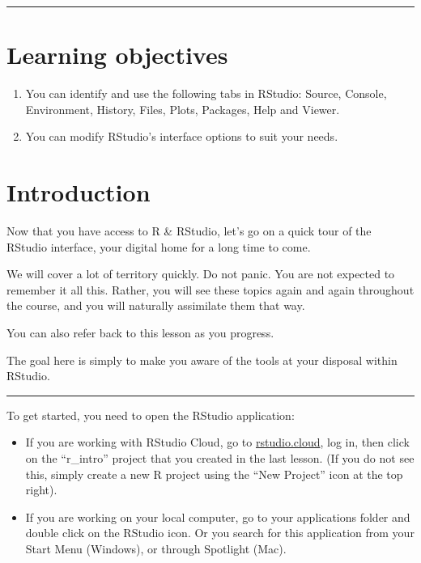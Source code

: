 \documentclass[
  letterpaper,
  DIV=11,
  numbers=noendperiod]{scrreprt}
\begin{document}
\begin{center}\rule{0.5\linewidth}{0.5pt}\end{center}

\hypertarget{learning-objectives}{%
\section{Learning objectives}\label{learning-objectives}}

\begin{enumerate}
\def\labelenumi{\arabic{enumi}.}
\item
  You can identify and use the following tabs in RStudio: Source,
  Console, Environment, History, Files, Plots, Packages, Help and
  Viewer.
\item
  You can modify RStudio's interface options to suit your needs.
\end{enumerate}

\hypertarget{introduction-3}{%
\section{Introduction}\label{introduction-3}}

Now that you have access to R \& RStudio, let's go on a quick tour of
the RStudio interface, your digital home for a long time to come.

We will cover a lot of territory quickly. Do not panic. You are not
expected to remember it all this. Rather, you will see these topics
again and again throughout the course, and you will naturally assimilate
them that way.

You can also refer back to this lesson as you progress.

The goal here is simply to make you aware of the tools at your disposal
within RStudio.

\begin{center}\rule{0.5\linewidth}{0.5pt}\end{center}

To get started, you need to open the RStudio application:

\begin{itemize}
\item
  If you are working with RStudio Cloud, go to
  \href{https://rstudio.cloud}{rstudio.cloud}, log in, then click on the
  ``r\_intro'' project that you created in the last lesson. (If you do
  not see this, simply create a new R project using the ``New Project''
  icon at the top right).
\item
  If you are working on your local computer, go to your applications
  folder and double click on the RStudio icon. Or you search for this
  application from your Start Menu (Windows), or through Spotlight
  (Mac).
\end{itemize}
\end{document}
